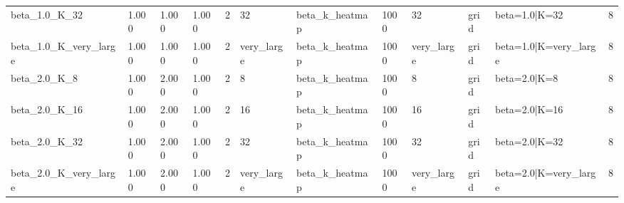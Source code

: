 \begin{tabular}{llllllllllll}
beta\_1.0\_K\_32 & 1.000 & 1.000 & 1.000 & 2 & 32 & beta\_k\_heatmap & 1000 & 32 & grid & beta=1.0|K=32 & 8 \\
beta\_1.0\_K\_very\_large & 1.000 & 1.000 & 1.000 & 2 & very\_large & beta\_k\_heatmap & 1000 & very\_large & grid & beta=1.0|K=very\_large & 8 \\
beta\_2.0\_K\_8 & 1.000 & 2.000 & 1.000 & 2 & 8 & beta\_k\_heatmap & 1000 & 8 & grid & beta=2.0|K=8 & 8 \\
beta\_2.0\_K\_16 & 1.000 & 2.000 & 1.000 & 2 & 16 & beta\_k\_heatmap & 1000 & 16 & grid & beta=2.0|K=16 & 8 \\
beta\_2.0\_K\_32 & 1.000 & 2.000 & 1.000 & 2 & 32 & beta\_k\_heatmap & 1000 & 32 & grid & beta=2.0|K=32 & 8 \\
beta\_2.0\_K\_very\_large & 1.000 & 2.000 & 1.000 & 2 & very\_large & beta\_k\_heatmap & 1000 & very\_large & grid & beta=2.0|K=very\_large & 8 \\
\bottomrule
\end{tabular}
